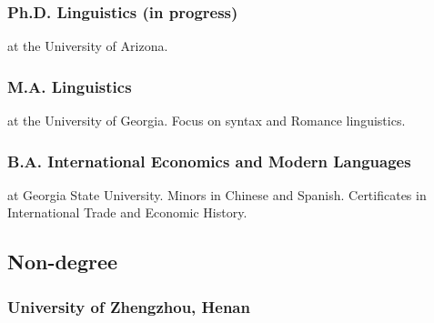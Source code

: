 \documentclass{article}
\begin{document}
\subsubsection{Ph.D. Linguistics (in progress)}

at the University of Arizona.

\subsubsection{M.A. Linguistics}

at the University of Georgia. Focus on syntax and Romance linguistics.

\subsubsection{B.A. International Economics and Modern Languages}

at Georgia State University. Minors in Chinese and Spanish. Certificates in International Trade and Economic History.

\subsection{Non-degree}

\subsubsection{University of Zhengzhou, Henan}
\end{document}
